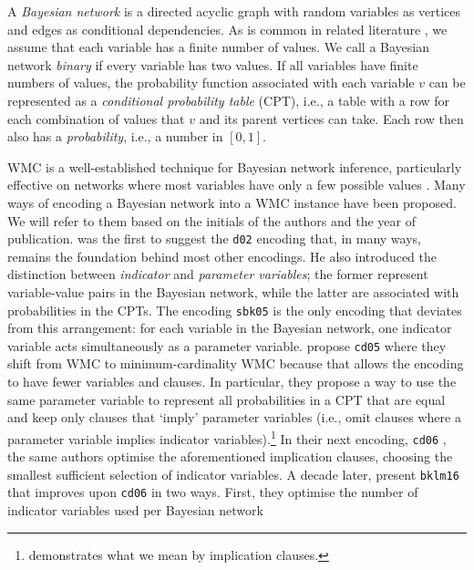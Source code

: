 A \emph{Bayesian network} is a directed acyclic graph with random variables as
vertices and edges as conditional dependencies. As is common in related
literature
\citep{DBLP:conf/kr/Darwiche02,DBLP:conf/aaai/SangBK05}, we assume that each
variable has a finite number of values. We call a Bayesian network \emph{binary}
if every variable has two values. If all variables have finite numbers of
values, the probability function associated with each variable $v$ can be
represented as a \emph{conditional probability table} (CPT), i.e., a table
with a row for each combination of values that $v$ and its parent vertices can
take. Each row then also has a \emph{probability}, i.e., a number in $[0, 1]$.

WMC is a well-established technique for Bayesian network inference, particularly
effective on networks where most variables have only a few possible values
\citep{DBLP:conf/kr/Darwiche02}. Many ways of encoding a Bayesian network into a
WMC instance have been proposed. We will refer to them based on the initials of
the authors and the year of publication.  was the first to suggest the
\texttt{d02} encoding that, in many ways, remains
the foundation behind most other encodings. He also introduced the distinction
between \emph{indicator} and \emph{parameter variables}; the former represent
variable-value pairs in the Bayesian network, while the latter are associated
with probabilities in the CPTs. The encoding \texttt{sbk05}
\citep{DBLP:conf/aaai/SangBK05} is the only encoding that deviates from this
arrangement: for each variable in the Bayesian network, one indicator variable
acts simultaneously as a parameter variable.  propose
\texttt{cd05} where they shift from WMC to
minimum-cardinality WMC because that allows the encoding to have fewer variables
and clauses. In particular, they propose a way to use the same parameter
variable to represent all probabilities in a CPT that are equal and keep only
clauses that `imply' parameter variables (i.e., omit clauses where a parameter
variable implies indicator variables).\footnote{ demonstrates
  what we mean by implication clauses.} In their next encoding, \texttt{cd06}
\citep{DBLP:conf/sat/ChaviraD06}, the same authors optimise the aforementioned
implication clauses, choosing the smallest sufficient selection of indicator
variables. A decade later, \citet{DBLP:conf/ecai/BartKLM16} present \texttt{bklm16} that improves upon \texttt{cd06} in two ways.
First, they optimise the number of indicator variables used per Bayesian network
